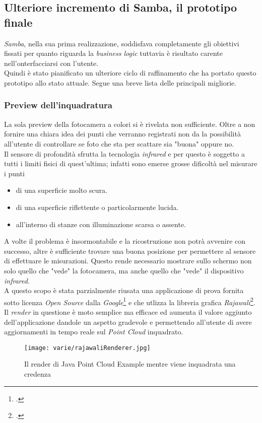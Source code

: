 \subsection{Ulteriore incremento di Samba, il prototipo finale}
\emph{Samba}, nella sua prima realizzazione, soddisfava completamente gli obiettivi fissati per quanto riguarda la \emph{business logic} tuttavia è risultato carente nell'onterfacciarsi con l'utente.\\
Quindi è stato pianificato un ulteriore ciclo di raffinamento che ha portato questo prototipo allo stato attuale. Segue una breve lista delle principali migliorie.

\subsubsection{Preview dell'inquadratura}
La sola preview della fotocamera a colori si è rivelata non sufficiente. Oltre a non fornire una chiara idea dei punti che verranno registrati non da la possibilità all'utente di controllare se foto che sta per scattare sia "buona" oppure no.\\
Il sensore di profondità sfrutta la tecnologia \emph{infrared} e per questo è soggetto a tutti i limiti fisici di quest'ultima; infatti sono emerse grosse dificoltà nel misurare i punti
\begin{itemize}
	\item di una superficie molto scura.
	\item di una superficie riflettente o particolarmente lucida.
	\item all'interno di stanze con illuminazione scarsa o assente.
\end{itemize}
A volte il problema è insormontabile e la ricostruzione non potrà avvenire con successo, altre è sufficiente trovare una buona posizione per permettere al sensore di effettuare le misurazioni. Questo rende necessario mostrare sullo schermo non solo quello che "vede" la fotocamera, ma anche quello che "vede" il dispositivo \emph{infrared}.\\
A questo scopo è stata parzialmente riusata una applicazione di prova fornita sotto licenza \emph{Open Source} dalla \emph{Google}\footcite{GitHub: https://github.com/googlesamples/tango-examples-java} e che utlizza la libreria grafica \emph{Rajawali}\footcite{GitHub: https://github.com/Rajawali/Rajawali}.\\
Il \emph{render} in questione è moto semplice ma efficace ed aumenta il valore aggiunto dell'applicazione dandole un aspetto gradevole e permettendo all'utente di avere aggiornamenti in tempo reale sul \emph{Point Cloud} inquadrato.
\begin{figure}[!h] 
    \centering 
    \texttt{[image: varie/rajawaliRenderer.jpg]} 
    \caption{Il render di Java Point Cloud Example mentre viene inquadrata una credenza}
\end{figure}



